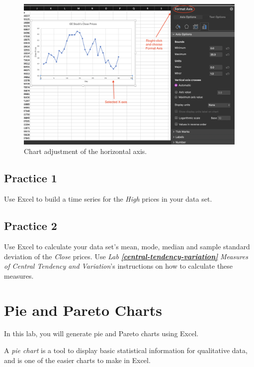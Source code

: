 \documentclass[
]{book}
\begin{document}
\begin{figure}

{\centering \includegraphics[width=0.8\linewidth]{images/adjust-axis} 

}

\caption{Chart adjustment of the horizontal axis.}\label{fig:adjust-axis}
\end{figure}

\hypertarget{practice-1-3}{%
\section{Practice 1}\label{practice-1-3}}

Use Excel to build a time series for the \emph{High} prices in your data set.

\hypertarget{practice-2-3}{%
\section{Practice 2}\label{practice-2-3}}

Use Excel to calculate your data set's mean, mode, median and sample standard deviation of the \emph{Close} prices. Use \emph{Lab} \textbf{\emph{\ref{central-tendency-variation}}} \emph{Measures of Central Tendency and Variation}'s instructions on how to calculate these measures.

\hypertarget{pie-and-pareto-charts}{%
\chapter{Pie and Pareto Charts}\label{pie-and-pareto-charts}}

In this lab, you will generate pie and Pareto charts using Excel.

A \emph{pie chart} is a tool to display basic statistical information for qualitative data, and is one of the easier charts to make in Excel.
\end{document}
